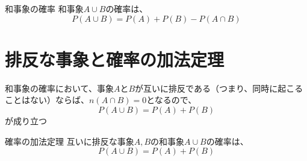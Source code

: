 \documentclass[../../../topic_probability-statistics]{subfiles}
\begin{document}
\begin{theorem}{和事象の確率}
  和事象$A \cup B$の確率は、
  \begin{equation*}
    P(A \cup B) = P(A) + P(B) - P(A \cap B)
  \end{equation*}
\end{theorem}

\sectionline
\section{排反な事象と確率の加法定理}

和事象の確率において、事象$A$と$B$が互いに排反である（つまり、同時に起こることはない）ならば、$n(A \cap B) = 0$となるので、
\begin{equation*}
  P(A \cup B) = P(A) + P(B)
\end{equation*}
が成り立つ

\begin{theorem}{確率の加法定理}
  互いに排反な事象$A,B$の和事象$A \cup B$の確率は、
  \begin{equation*}
    P(A \cup B) = P(A) + P(B)
  \end{equation*}
\end{theorem}
\end{document}
